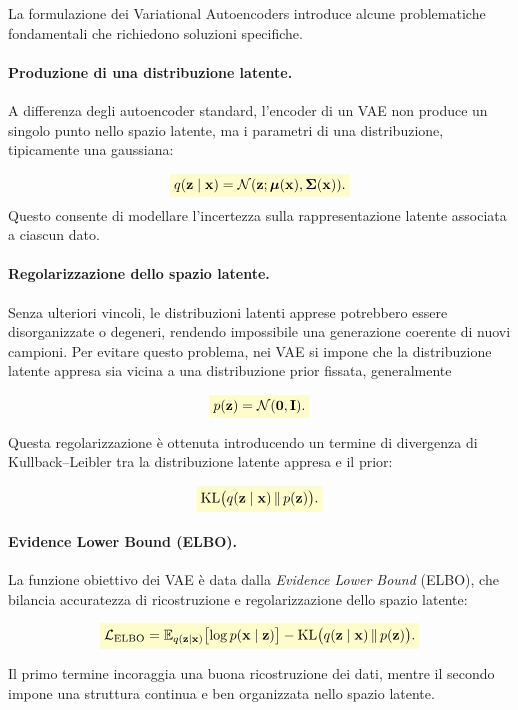 \documentclass[a4paper,12pt]{report}
\newcommand{\highlight}[1]{%
\colorbox{yellow!20}{$\displaystyle #1$}%
}
\begin{document}
La formulazione dei Variational Autoencoders introduce alcune problematiche fondamentali che richiedono soluzioni specifiche.

\paragraph{Produzione di una distribuzione latente.}
A differenza degli autoencoder standard, l’encoder di un VAE non produce un singolo punto nello spazio latente, 
ma i parametri di una distribuzione, tipicamente una gaussiana:

\[
\highlight{
q(\mathbf{z} \mid \mathbf{x}) = \mathcal{N}(\mathbf{z}; \boldsymbol{\mu}(\mathbf{x}), \boldsymbol{\Sigma}(\mathbf{x})).}
\]
Questo consente di modellare l’incertezza sulla rappresentazione latente associata a ciascun dato.

\paragraph{Regolarizzazione dello spazio latente.}
Senza ulteriori vincoli, le distribuzioni latenti apprese potrebbero essere disorganizzate o degeneri, rendendo impossibile una 
generazione coerente di nuovi campioni. Per evitare questo problema, nei VAE si impone che la distribuzione latente appresa sia 
vicina a una distribuzione prior fissata, generalmente

\[
\highlight{
p(\mathbf{z}) = \mathcal{N}(\mathbf{0}, \mathbf{I}).}
\]

Questa regolarizzazione è ottenuta introducendo un termine di divergenza di Kullback--Leibler tra la distribuzione latente 
appresa e il prior:

\[
\highlight{
\mathrm{KL}\bigl(q(\mathbf{z} \mid \mathbf{x}) \,\|\, p(\mathbf{z})\bigr).}
\]

\paragraph{Evidence Lower Bound (ELBO).}
La funzione obiettivo dei VAE è data dalla \emph{Evidence Lower Bound} (ELBO), che bilancia accuratezza di ricostruzione e 
regolarizzazione dello spazio latente:

\[
\highlight{
\mathcal{L}_{\text{ELBO}} =
\mathbb{E}_{q(\mathbf{z} \mid \mathbf{x})}
\bigl[\log p(\mathbf{x} \mid \mathbf{z})\bigr]
-
\mathrm{KL}\bigl(q(\mathbf{z} \mid \mathbf{x}) \,\|\, p(\mathbf{z})\bigr).}
\]

Il primo termine incoraggia una buona ricostruzione dei dati, mentre il secondo impone una struttura continua e ben organizzata 
nello spazio latente.
\end{document}
